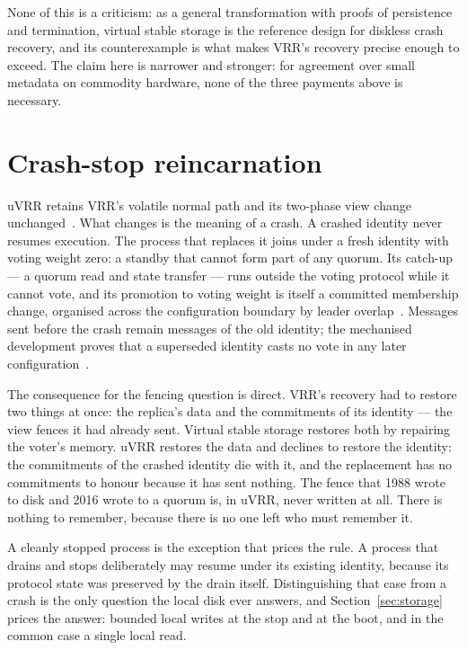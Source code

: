 \documentclass[10pt,journal,letterpaper]{IEEEtran}
\begin{document}
None of this is a criticism: as a general transformation with proofs of
persistence and termination, virtual stable storage is the reference design
for diskless crash recovery, and its counterexample is what makes VRR's
recovery precise enough to exceed.
The claim here is narrower and stronger: for agreement over small metadata on
commodity hardware, none of the three payments above is necessary.

\section{Crash-stop reincarnation}\label{sec:reincarnation}
uVRR retains VRR's volatile normal path and its two-phase view change
unchanged~\cite{vrr,uvrr}.
What changes is the meaning of a crash.
A crashed identity never resumes execution.
The process that replaces it joins under a fresh identity with voting weight
zero: a standby that cannot form part of any quorum.
Its catch-up --- a quorum read and state transfer --- runs outside the voting
protocol while it cannot vote, and its promotion to voting weight is itself a
committed membership change, organised across the configuration boundary by
leader overlap~\cite{turner,uvrr}.
Messages sent before the crash remain messages of the old identity; the
mechanised development proves that a superseded identity casts no vote in any
later configuration~\cite{uvrr,artifact}.

The consequence for the fencing question is direct.
VRR's recovery had to restore two things at once: the replica's data and the
commitments of its identity --- the view fences it had already sent.
Virtual stable storage restores both by repairing the voter's memory.
uVRR restores the data and declines to restore the identity: the commitments
of the crashed identity die with it, and the replacement has no commitments
to honour because it has sent nothing.
The fence that 1988 wrote to disk and 2016 wrote to a quorum is, in uVRR,
never written at all.
There is nothing to remember, because there is no one left who must remember
it.

A cleanly stopped process is the exception that prices the rule.
A process that drains and stops deliberately may resume under its existing
identity, because its protocol state was preserved by the drain itself.
Distinguishing that case from a crash is the only question the local disk
ever answers, and Section~\ref{sec:storage} prices the answer: bounded local
writes at the stop and at the boot, and in the common case a single local
read.
\end{document}

